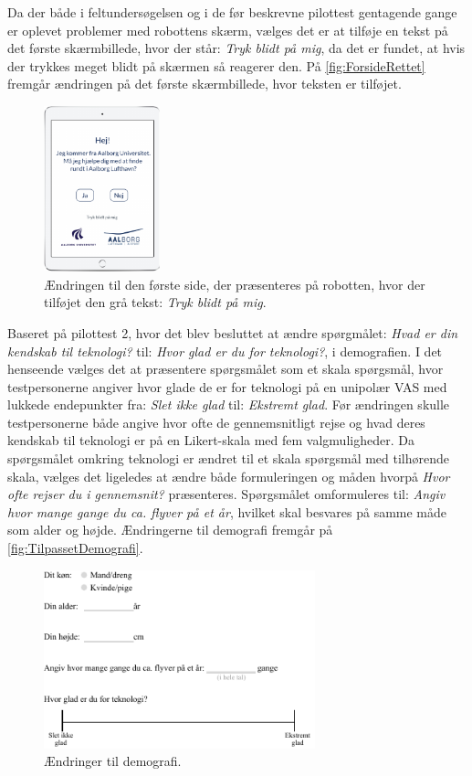 Da der både i feltundersøgelsen og i de før beskrevne pilottest gentagende gange er oplevet problemer med robottens skærm, vælges det er at tilføje en tekst på det første skærmbillede, hvor der står: \textit{Tryk blidt på mig}, da det er fundet, at hvis der trykkes meget blidt på skærmen så reagerer den. På \autoref{fig:ForsideRettet} fremgår ændringen på det første skærmbillede, hvor teksten er tilføjet.    
%
\begin{figure}[H]
\centering
\includegraphics[width = 0.3\textwidth]{Figure/TestdesignEvaluering/ForsideRettet} 
\caption{Ændringen til den første side, der præsenteres på robotten, hvor der tilføjet den grå tekst: \textit{Tryk blidt på mig}.}
\label{fig:ForsideRettet}
\end{figure}
\noindent
%
Baseret på pilottest 2, hvor det blev besluttet at ændre spørgmålet: \textit{Hvad er din kendskab til teknologi?} til: \textit{Hvor glad er du for teknologi?}, i demografien. I det henseende vælges det at præsentere spørgsmålet som et skala spørgsmål, hvor testpersonerne angiver hvor glade de er for teknologi på en unipolær VAS med lukkede endepunkter fra: \textit{Slet ikke glad} til: \textit{Ekstremt glad}. Før ændringen skulle testpersonerne både angive hvor ofte de gennemsnitligt rejse og hvad deres kendskab til teknologi er på en Likert-skala med fem valgmuligheder. Da spørgsmålet omkring teknologi er ændret til et skala spørgsmål med tilhørende skala, vælges det ligeledes at ændre både formuleringen og måden hvorpå \textit{Hvor ofte rejser du i gennemsnit?} præsenteres. Spørgsmålet omformuleres til: \textit{Angiv hvor mange gange du ca. flyver på et år}, hvilket skal besvares på samme måde som alder og højde. Ændringerne til demografi fremgår på \autoref{fig:TilpassetDemografi}.
\newpage
%
\begin{figure}[H]
\centering
\includegraphics[width = 0.7\textwidth]{Figure/TestdesignEvaluering/TilpassetDemografi} 
\caption{Ændringer til demografi.}
\label{fig:TilpassetDemografi}
\end{figure}
